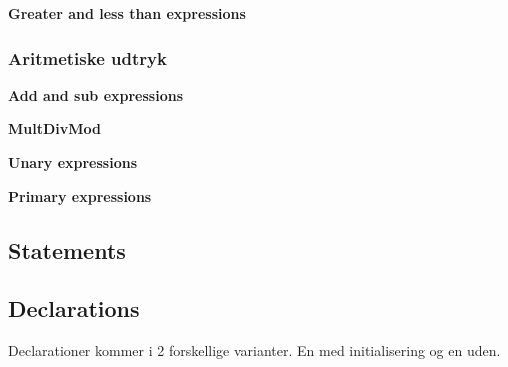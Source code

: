 \textbf{Greater and less than expressions}

    

\subsubsection{Aritmetiske udtryk}

\textbf{Add and sub expressions}

    
  
\textbf{MultDivMod}

    

\textbf{Unary expressions}

     
  
\textbf{Primary expressions}

    


\subsection{Statements}



\subsection{Declarations}
Declarationer kommer i 2 forskellige varianter. En med initialisering og en uden.


